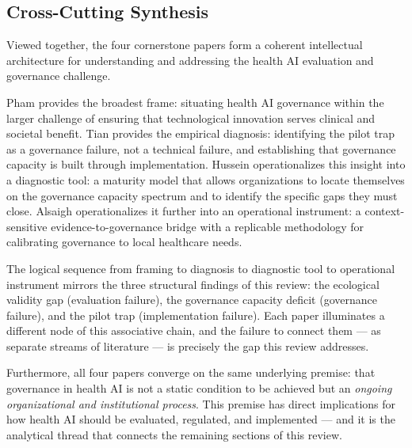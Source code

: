 \subsection{Cross-Cutting Synthesis}
\label{sec:cross_cutting}

Viewed together, the four cornerstone papers form a coherent intellectual
architecture for understanding and addressing the health AI evaluation
and governance challenge.

Pham provides the broadest frame: situating health AI governance within
the larger challenge of ensuring that technological innovation serves
clinical and societal benefit. Tian provides the empirical diagnosis:
identifying the pilot trap as a governance failure, not a technical
failure, and establishing that governance capacity is built through
implementation. Hussein operationalizes this insight into a diagnostic
tool: a maturity model that allows organizations to locate themselves
on the governance capacity spectrum and to identify the specific gaps
they must close. Alsaigh operationalizes it further into an operational
instrument: a context-sensitive evidence-to-governance bridge with a
replicable methodology for calibrating governance to local healthcare needs.

The logical sequence from framing to diagnosis to diagnostic tool to
operational instrument mirrors the three structural findings of this
review: the ecological validity gap (evaluation failure), the governance
capacity deficit (governance failure), and the pilot trap (implementation
failure). Each paper illuminates a different node of this associative chain,
and the failure to connect them — as separate streams of literature —
is precisely the gap this review addresses.

Furthermore, all four papers converge on the same underlying premise:
that governance in health AI is not a static condition to be achieved
but an \textit{ongoing organizational and institutional process}. This
premise has direct implications for how health AI should be evaluated,
regulated, and implemented — and it is the analytical thread that
connects the remaining sections of this review.